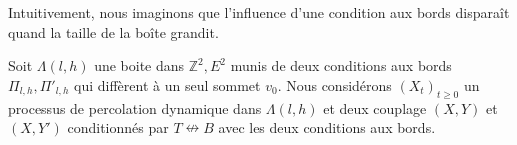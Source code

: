 \documentclass[titlepage,a4paper,12pt]{article}
\newcounter{prop}
\begin{document}
Intuitivement, nous imaginons que l'influence d'une condition aux bords disparaît quand la taille de la boîte grandit. %

Soit $\Lambda(l,h)$ une boite dans $\mathbb{Z}^2,E^2$ munis de deux conditions aux bords $\Pi_{l,h}, \Pi'_{l,h}$ qui diffèrent à un seul sommet $v_0$. Nous considérons $(X_t)_{t\geqslant 0}$ un processus de percolation dynamique dans $\Lambda(l,h)$ et deux couplage $(X,Y)$ et $(X,Y')$ conditionnés par $T\nleftrightarrow B$ avec les deux conditions aux bords.
\end{document}
